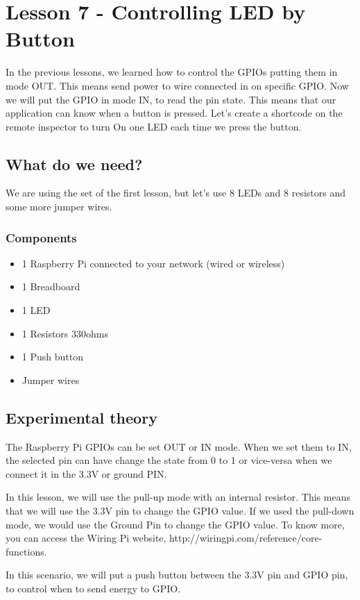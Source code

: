 \documentclass[10pt,twoside,english]{_support/latex/sbabook/sbabook}
\begin{document}
\frontmatter
\pagestyle{plain}

\tableofcontents*
\clearpage\listoffigures

\mainmatter

\chapter{Lesson 7 - Controlling LED by Button}
In the previous lessons, we learned how to control the GPIOs putting them in mode OUT. This means send power to wire connected in on specific GPIO. Now we will put the GPIO in mode IN, to read the pin state. This means that our application can know when a button is pressed. Let’s create a shortcode on the remote inspector to turn On one LED each time we press the button.
\section{What do we need?}
We are using the set of the first lesson, but let's use 8 LEDs and 8 resistors and some more jumper wires.
\subsection{Components}
\begin{itemize}
\item 1 Raspberry Pi connected to your network (wired or wireless)
\item 1 Breadboard
\item 1 LED
\item 1 Resistors 330ohms
\item 1 Push button
\item Jumper wires
\end{itemize}
\section{Experimental theory}
The Raspberry Pi GPIOs can be set OUT or IN mode. When we set them to IN, the selected pin can have change the state from 0 to 1 or vice-versa when we connect it in the 3.3V or ground PIN.

In this lesson, we will use the pull-up mode with an internal resistor. This means that we will use the 3.3V pin to change the GPIO value. If we used the pull-down mode, we would use the Ground Pin to change the GPIO value. To know more, you can access the Wiring Pi website, http://wiringpi.com/reference/core-functions.

In this scenario, we will put a push button between the 3.3V pin and GPIO pin, to control when to send energy to GPIO.
\end{document}
